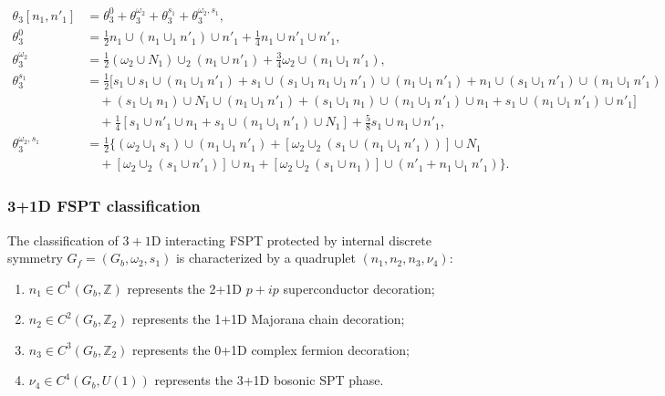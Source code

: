 \documentclass[%
 reprint,
 amsmath,amssymb,
 aps,
prb,
]{revtex4-2}
\begin{document}
\begin{widetext}
\begin{align}
\theta _{3}[ n_{1} ,n'_{1}] &=\theta _{3}^{0} +\theta _{3}^{\omega _{2}} +\theta _{3}^{s_{1}} +\theta _{3}^{\omega _{2} ,s_{1}},\label{eq:2D Majorana phase.1}\\
\theta _{3}^{0} &=\frac{1}{2} n_{1} \cup ( n_{1} \cup _{1} n'_{1}) \cup n'_{1} +\frac{1}{4} n_{1} \cup n'_{1} \cup n'_{1} ,\label{eq:2D Majorana phase.2}\\
\theta _{3}^{\omega _{2}} &=\frac{1}{2}( \omega _{2} \cup N_{1}) \cup _{2}( n_{1} \cup n'_{1}) +\frac{3}{4} \omega _{2} \cup ( n_{1} \cup _{1} n'_{1}) ,\label{eq:2D Majorana phase.3}\\\nonumber
\theta _{3}^{s_{1}} & =  \frac{1}{2}[s_{1} \cup s_{1} \cup ( n_{1} \cup _{1} n'_{1}) +s_{1} \cup ( s_{1} \cup _{1} n_{1} \cup _{1} n'_{1}) \cup ( n_{1} \cup _{1} n'_{1}) +n_{1} \cup ( s_{1} \cup _{1} n'_{1}) \cup ( n_{1} \cup _{1} n'_{1})\\\nonumber
&\quad   +( s_{1} \cup _{1} n_{1}) \cup N_{1} \cup ( n_{1} \cup _{1} n'_{1}) +( s_{1} \cup _{1} n_{1}) \cup ( n_{1} \cup _{1} n'_{1}) \cup n_{1} +s_{1} \cup ( n_{1} \cup _{1} n'_{1}) \cup n'_{1}]\\
&\quad   +\frac{1}{4}[s_{1} \cup n'_{1} \cup n_{1} +s_{1} \cup ( n_{1} \cup _{1} n'_{1}) \cup N_{1}] +\frac{5}{8} s_{1} \cup n_{1} \cup n'_{1},\label{eq:2D Majorana phase.4}\\\nonumber
\theta _{3}^{\omega _{2} ,s_{1}} & =  \frac{1}{2}\{( \omega _{2} \cup _{1} s_{1}) \cup ( n_{1} \cup _{1} n'_{1}) +[ \omega _{2} \cup _{2}( s_{1} \cup ( n_{1} \cup _{1} n'_{1}))] \cup N_{1}\\
&\quad   +[ \omega _{2} \cup _{2}( s_{1} \cup n'_{1})] \cup n_{1} +[ \omega _{2} \cup _{2}( s_{1} \cup n_{1})] \cup ( n'_{1} +n_{1} \cup _{1} n'_{1})\}. \label{eq:2D Majorana phase.5}
\end{align}
\end{widetext}


\subsubsection{3+1D FSPT classification}

The classification of $3+1$D interacting FSPT protected by internal discrete symmetry $G_f = (G_b, \omega_2, s_1)$ is characterized by a quadruplet $(n_1,n_2,n_3,\nu_4)$:  
\begin{enumerate}
\item $n_1 \in C^1(G_b, \mathbb Z)$ represents the 2+1D $p+ip$ superconductor decoration; 
\item  $n_2 \in C^2(G_b, \mathbb Z_2)$ represents the 1+1D Majorana chain decoration; 
\item  $n_3 \in C^3(G_b, \mathbb Z_2)$ represents the 0+1D complex fermion decoration;
\item  $\nu_4 \in C^4(G_b, U(1))$ represents the 3+1D bosonic SPT phase.
\end{enumerate}
\end{document}

